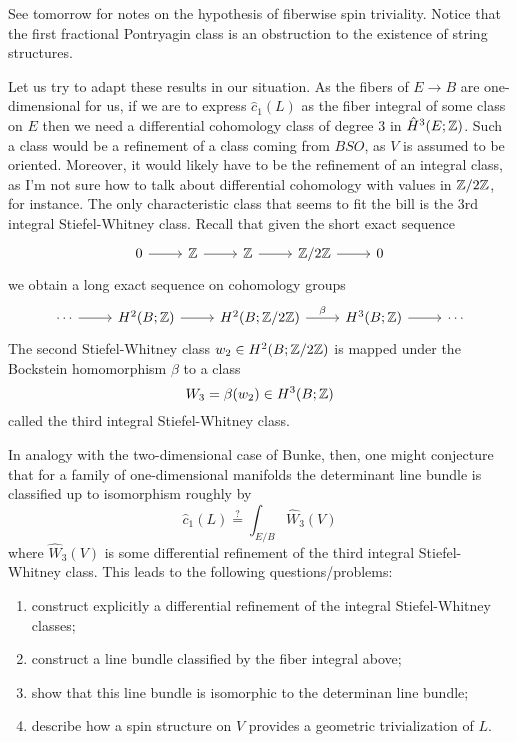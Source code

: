 \documentclass{amsart}
\begin{document}
See tomorrow for notes on the hypothesis of fiberwise spin triviality.
Notice that the first fractional Pontryagin class is an obstruction to the
existence of string structures.

Let us try to adapt these results in our situation. As the fibers of $E\to B$
are one-dimensional for us, if we are to express $\hat c_1(L)$ as the fiber
integral of some class on $E$ then we need a differential cohomology class
of degree 3 in $\hat H^3(E;\mathbb{Z})$. Such a class would be a refinement of a
class coming from $BSO$, as $V$ is assumed to be oriented. Moreover, it
would likely have to be the refinement of an integral class, as I'm not
sure how to talk about differential cohomology with values in $\mathbb{Z}/2\mathbb{Z}$, for instance.
The only characteristic class that seems to fit the bill is the 3rd integral
Stiefel-Whitney class. Recall that given the short exact sequence
\begin{equation*}
    \begin{tikzcd}
        0\rar & \Z \rar & \Z \rar & \Z/2\Z \rar & 0
    \end{tikzcd}
\end{equation*}
we obtain a long exact sequence on cohomology groups
\begin{equation*}
    \begin{tikzcd}
        \cdots \rar & H^2(B; \Z) \rar & H^2(B; \Z/2\Z) \rar{\beta} & H^3(B;\Z) \rar & \cdots
    \end{tikzcd}
\end{equation*}
The second Stiefel-Whitney class $w_2\in H^2(B;\mathbb{Z}/2\mathbb{Z})$ is mapped under the Bockstein
homomorphism $\beta$ to a class
\begin{equation*}
    W_3=\beta(w_2)\in H^3(B;\mathbb{Z})
\end{equation*}
called the third integral Stiefel-Whitney class.

In analogy with the two-dimensional case of Bunke, then, one might conjecture
that for a family of one-dimensional manifolds the determinant line bundle
is classified up to isomorphism roughly by
\begin{equation*}
    \hat c_1(L) \overset{?}{=} \int_{E/B} \hat W_3(V)
\end{equation*}
where $\hat W_3(V)$ is some differential refinement of the third integral Stiefel-Whitney
class. This leads to the following questions/problems:
\begin{enumerate}
    \item construct explicitly a differential refinement of the integral Stiefel-Whitney classes;
    \item construct a line bundle classified by the fiber integral above;
    \item show that this line bundle is isomorphic to the determinan line bundle;
    \item describe how a spin structure on $V$ provides a geometric trivialization of $L$.
\end{enumerate}
\end{document}
